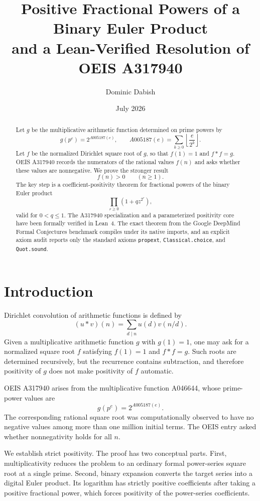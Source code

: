 \documentclass[11pt]{article}
\title{Positive Fractional Powers of a Binary Euler Product\\and a Lean-Verified Resolution of OEIS A317940}
\author{Dominic Dabish}
\date{July 2026}
\theoremstyle{definition}
\theoremstyle{remark}
\begin{document}
\maketitle

\begin{abstract}
Let $g$ be the multiplicative arithmetic function determined on prime powers by
\[
  g(p^e)=2^{A005187(e)},
  \qquad
  A005187(e)=\sum_{k\ge0}\left\lfloor\frac{e}{2^k}\right\rfloor.
\]
Let $f$ be the normalized Dirichlet square root of $g$, so that $f(1)=1$ and
$f*f=g$.  OEIS A317940 records the numerators of the rational values $f(n)$ and asks whether these values are nonnegative.  We prove the stronger result
\[
  f(n)>0\qquad(n\ge1).
\]
The key step is a coefficient-positivity theorem for fractional powers of the binary Euler product
\[
  \prod_{r\ge0}(1+qz^{2^r}),
\]
valid for $0<q\le1$.  The A317940 specialization and a parameterized positivity core have been formally verified in Lean~4.  The exact theorem from the Google DeepMind Formal Conjectures benchmark compiles under its native imports, and an explicit axiom audit reports only the standard axioms \texttt{propext}, \texttt{Classical.choice}, and \texttt{Quot.sound}.
\end{abstract}

\section{Introduction}

Dirichlet convolution of arithmetic functions is defined by
\[
  (u*v)(n)=\sum_{d\mid n}u(d)v(n/d).
\]
Given a multiplicative arithmetic function $g$ with $g(1)=1$, one may ask for a normalized square root $f$ satisfying $f(1)=1$ and $f*f=g$.  Such roots are determined recursively, but the recurrence contains subtraction, and therefore positivity of $g$ does not make positivity of $f$ automatic.

OEIS A317940 arises from the multiplicative function A046644, whose prime-power values are
\[
  g(p^e)=2^{A005187(e)}.
\]
The corresponding rational square root was computationally observed to have no negative values among more than one million initial terms.  The OEIS entry asked whether nonnegativity holds for all $n$.

We establish strict positivity.  The proof has two conceptual parts.  First, multiplicativity reduces the problem to an ordinary formal power-series square root at a single prime.  Second, binary expansion converts the target series into a digital Euler product.  Its logarithm has strictly positive coefficients after taking a positive fractional power, which forces positivity of the power-series coefficients.
\end{document}
